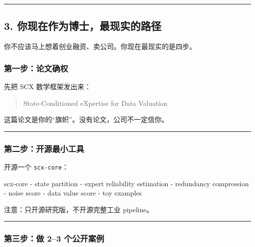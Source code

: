 \documentclass[
  12pt,
]{ctexart}
\newenvironment{Shaded}{}{}
\newcommand{\NormalTok}[1]{#1}
\begin{document}
\begin{center}\rule{0.5\linewidth}{0.5pt}\end{center}

\subsection{3.
你现在作为博士，最现实的路径}\label{ux4f60ux73b0ux5728ux4f5cux4e3aux535aux58ebux6700ux73b0ux5b9eux7684ux8defux5f84}

你不应该马上想着创业融资、卖公司。你现在最现实的是四步。

\subsubsection{第一步：论文确权}\label{ux7b2cux4e00ux6b65ux8bbaux6587ux786eux6743}

先把 SCX 数学框架发出来：

\begin{quote}
State-Conditioned eXpertise for Data Valuation
\end{quote}

这篇论文是你的``旗帜''。没有论文，公司不一定信你。

\begin{center}\rule{0.5\linewidth}{0.5pt}\end{center}

\subsubsection{第二步：开源最小工具}\label{ux7b2cux4e8cux6b65ux5f00ux6e90ux6700ux5c0fux5de5ux5177}

开源一个 \texttt{scx-core}：

\begin{Shaded}
\begin{Highlighting}[]
\NormalTok{scx{-}core}
\NormalTok{  {-} state partition}
\NormalTok{  {-} expert reliability estimation}
\NormalTok{  {-} redundancy compression}
\NormalTok{  {-} noise score}
\NormalTok{  {-} data value score}
\NormalTok{  {-} toy examples}
\end{Highlighting}
\end{Shaded}

注意：只开源研究版，不开源完整工业 pipeline。

\begin{center}\rule{0.5\linewidth}{0.5pt}\end{center}

\subsubsection{第三步：做 2--3
个公开案例}\label{ux7b2cux4e09ux6b65ux505a-23-ux4e2aux516cux5f00ux6848ux4f8b}
\end{document}
